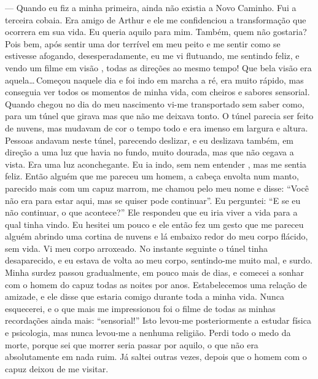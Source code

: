 --- Quando eu fiz a minha primeira, ainda não existia a Novo Caminho. Fui a terceira cobaia. Era amigo de Arthur e ele me confidenciou a transformação que ocorrera em sua vida. Eu queria aquilo para mim. Também, quem não gostaria? Pois bem, após sentir uma dor terrível em meu peito e me sentir como se estivesse afogando, desesperadamente, eu me vi flutuando, me sentindo feliz, e vendo um filme em visão , todas as direções ao mesmo tempo! Que bela visão era aquela\ldots\,Começou naquele dia e foi indo em marcha a ré, era muito rápido, mas conseguia ver todos os momentos de minha vida, com cheiros e sabores sensorial. Quando chegou no dia do meu nascimento\mudanca{,} vi-me transportado\mudanca{,} sem saber como, para um túnel que girava mas que não me deixava tonto. O túnel parecia ser feito de nuvens, mas  mudavam de cor o tempo todo\mudanca{,} e era imenso em largura e altura. Pessoas andavam neste túnel, parecendo deslizar, e eu deslizava também, em direção a uma luz que havia no fundo, muito dourada, mas que não cegava a vista. Era uma luz aconchegante. Eu ia indo, sem nem entender , mas me sentia feliz. Então alguém\mudanca{,} que me pareceu um homem,  a cabeça envolta num manto, parecido mais com um capuz marrom, me chamou pelo meu nome e disse: ``Você não era para estar aqui, mas\mudanca{,} se quiser\mudanca{,} pode continuar''. Eu perguntei: ``E se eu não continuar, o que acontece?'' Ele respondeu que eu iria viver a vida para a qual tinha vindo. Eu hesitei um pouco e ele\mudanca{,} então\mudanca{,} fez um gesto que me pareceu alguém abrindo uma cortina de nuvens\mudanca{,} e  lá embaixo  redor do meu corpo flácido, sem vida. Vi meu corpo arroxeado. No instante seguinte\mudanca{,} o túnel tinha desaparecido, e eu estava de volta ao meu corpo, sentindo-me muito mal, e surdo. Minha surdez passou gradualmente, em pouco mais de  dias, e comecei a sonhar com o homem do capuz todas as noites por  anos. Estabelecemos uma relação de amizade, e ele disse que estaria comigo durante toda a minha vida. Nunca esquecerei, e o que mais me impressionou foi o filme de todas as minhas recordações\mudanca{;} ainda mais: ``sensorial!'' Isto levou-me posteriormente a estudar física e psicologia, mas nunca levou-me a nenhuma religião. Perdi todo o medo da morte, porque sei que morrer seria passar por aquilo, o que não era\mudanca{,} absolutamente\mudanca{,} em nada ruim. Já saltei outras vezes, depois que o homem com o capuz deixou de me visitar.

